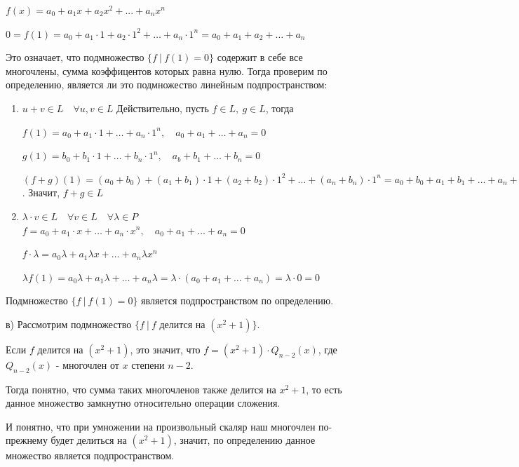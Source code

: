 \documentclass[]{book}
\theoremstyle{definition}
\begin{document}
\begin{enumerate}[resume]
$f(x) = a_0 + a_1x + a_2x^2 + ... + a_nx^n$

$0 = f(1) = a_0 + a_1\cdot 1 + a_2\cdot1^2 + \ldots + a_n\cdot1^n = a_0 + a_1 + a_2 + \ldots + a_n$

Это означает, что подмножество $\{f \ |\ f(1) =0\}$ содержит в себе все многочлены, сумма коэффицентов которых равна нулю. Тогда проверим по определению, является ли это подмножество линейным подпространством:

\begin{enumerate}
    \item $u + v \in L \quad \forall u, v \in L$
    Действительно, пусть $f \in L, \: g \in L$, тогда
    
    $f(1) = a_0 + a_1\cdot 1 + \ldots + a_n\cdot 1^n, \quad a_0 + a_1 + \ldots + a_n = 0$
    
    $g(1) = b_0 + b_1\cdot 1 + \ldots + b_n\cdot 1^n, \quad a_b + b_1 + \ldots + b_n = 0$
    
    $(f + g)(1) = (a_0 + b_0) + (a_1 + b_1)\cdot 1+ (a_2 + b_2)\cdot 1^2 + \ldots + (a_n + b_n)\cdot 1^n = a_0 + b_0 + a_1 + b_1 + \ldots + a_n + b_n = 0 + 0 = 0$. Значит, $f + g \in L$
    
    \item $\lambda\cdot v \in L \quad \forall v \in L \quad \forall \lambda \in P$
    $f = a_0 + a_1\cdot x + \ldots + a_n\cdot x^n, \quad a_0 + a_1 + \ldots + a_n = 0$
    
    $f\cdot\lambda = a_0\lambda + a_1\lambda x + \ldots + a_n\lambda x^n$
    
    $\lambda f(1) = a_0\lambda + a_1\lambda + \ldots + a_n\lambda = \lambda\cdot(a_0 + a_1 + \ldots + a_n) = \lambda\cdot 0 = 0$
    
\end{enumerate}

Подмножество $\{f \ |\ f(1) =0\}$ является подпространством по определению.

в) Рассмотрим подмножество $\{f \ |\ f \text{ делится на } (x^2 + 1) \}$. 

Если $f$ делится на $(x^2 + 1)$, это значит, что $f = (x^2 + 1)\cdot Q_{n-2}(x)$, где $Q_{n-2}(x)$ - многочлен от $x$ степени $n - 2$.

Тогда понятно, что сумма таких многочленов также делится на $x^2 + 1$, то есть данное множество замкнутно относительно операции сложения.

И понятно, что при умножении на произвольный скаляр наш многочлен по-прежнему будет делиться на $(x^2 + 1)$, значит, по определению данное множество является подпространством.



\end{enumerate}
\end{document}

